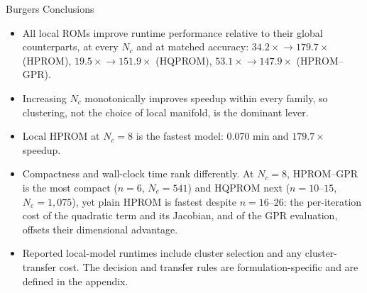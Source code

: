 \documentclass[aspectratio=169]{beamer}
\begin{document}
\begin{frame}{Burgers Conclusions}
\begin{itemize}
  \item All local ROMs improve runtime performance relative to their global counterparts, at every $N_c$ and at matched accuracy: $34.2\times\!\to\!179.7\times$ (HPROM), $19.5\times\!\to\!151.9\times$ (HQPROM), $53.1\times\!\to\!147.9\times$ (HPROM--GPR).
  \item Increasing $N_c$ monotonically improves speedup within every family, so clustering, not the choice of local manifold, is the dominant lever.
  \item Local HPROM at $N_c=8$ is the fastest model: 0.070 min and $179.7\times$ speedup.
  \item Compactness and wall-clock time rank differently. At $N_c=8$, HPROM--GPR is the most compact ($n=6$, $N_e=541$) and HQPROM next ($n=10$--$15$, $N_e=1{,}075$), yet plain HPROM is fastest despite $n=16$--$26$: the per-iteration cost of the quadratic term and its Jacobian, and of the GPR evaluation, offsets their dimensional advantage.
  \item Reported local-model runtimes include cluster selection and any cluster-transfer cost. The decision and transfer rules are formulation-specific and are defined in the appendix.
\end{itemize}
\end{frame}
\end{document}
